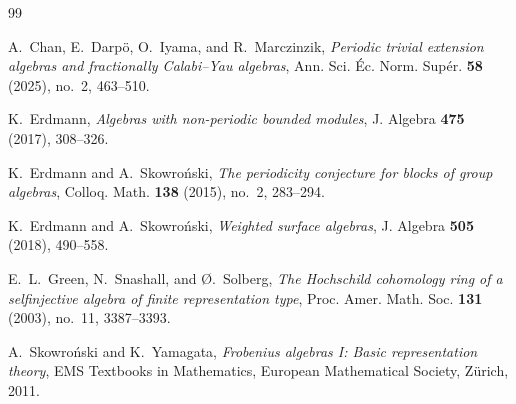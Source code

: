 \documentclass[a4paper,reqno,10pt]{amsart}
\theoremstyle{definition}
\numberwithin{equation}{section}
\begin{document}
\begin{thebibliography}{99}

A.~Chan, E.~Darp\"o, O.~Iyama, and R.~Marczinzik,
\emph{Periodic trivial extension algebras and fractionally Calabi--Yau
algebras},
Ann. Sci. \'{E}c. Norm. Sup\'{e}r. \textbf{58} (2025), no.~2, 463--510.

K.~Erdmann,
\emph{Algebras with non-periodic bounded modules},
J. Algebra \textbf{475} (2017), 308--326.

K.~Erdmann and A.~Skowro\'nski,
\emph{The periodicity conjecture for blocks of group algebras},
Colloq. Math. \textbf{138} (2015), no.~2, 283--294.

K.~Erdmann and A.~Skowro\'nski,
\emph{Weighted surface algebras},
J. Algebra \textbf{505} (2018), 490--558.

E.~L.~Green, N.~Snashall, and \O.~Solberg,
\emph{The Hochschild cohomology ring of a selfinjective algebra of finite
representation type},
Proc. Amer. Math. Soc. \textbf{131} (2003), no.~11, 3387--3393.

A.~Skowro\'nski and K.~Yamagata,
\emph{Frobenius algebras I: Basic representation theory},
EMS Textbooks in Mathematics, European Mathematical Society, Z\"urich, 2011.

\end{thebibliography}
\end{document}
